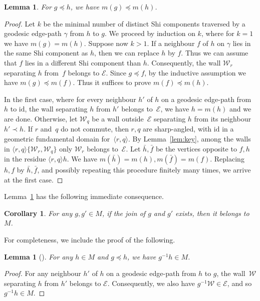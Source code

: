 \documentclass[11pt]{article}
\newtheorem{lemm}[theo]{Lemma}
\newtheorem{coro}[theo]{Corollary}
\theoremstyle{definition}
\numberwithin{equation}{section}
\newcommand{\id}{\mathrm{id}}
\newcommand{\W}{\mathcal{W}}
\begin{document}
\begin{lemm} 
	\label{lem:shadow}
	For $g\preceq h$, we have $m(g)\preceq m(h)$.
\end{lemm}
\begin{proof} Let $k$ be the minimal number of distinct Shi components traversed by a geodesic edge-path $\gamma$ from $h$ to $g$. We proceed by induction on $k$, where for $k=1$ we have $m(g)=m(h)$.
	Suppose now $k>1$.
	If a neighbour $f$ of $h$ on $\gamma$ lies in the same Shi component as $h$, then we can replace $h$ by $f$. Thus we can assume that $f$ lies in a different Shi component than $h$. Consequently, the wall $\W_r$ separating $h$ from~$f$ belongs to $\mathcal E$. Since $g\preceq f$, by the inductive assumption we have $m(g)\preceq m(f)$. Thus it suffices to prove $m(f)\preceq m(h)$.
	
	In the first case, where for every neighbour $h'$ of $h$ on a geodesic edge-path from~$h$ to $\id$, the wall separating $h$ from $h'$ belongs to~$\mathcal E$, we have $h=m(h)$ and we are done. Otherwise, let $\W_q$ be a wall outside~$\mathcal E$ separating $h$ from its neighbour $h'\prec h$. 
	If $r$ and~$q$ do not commute, then $r,q$ are sharp-angled, with $\id$
	in a geometric fundamental domain for~$\langle r,q\rangle$. By Lemma~\ref{lem:key}, among the walls in $\langle r,q\rangle\{\W_r,\W_q\}$ only $\W_r$ belongs to~$\mathcal E$. Let $\bar h, \bar f$ be the vertices opposite to $f,h$ in the residue $\langle r,q\rangle h$. We have $m(\bar h)=m(h), m(\bar f)=m(f)$. Replacing $h,f$ by $\bar h,\bar f$, and possibly repeating this procedure finitely many times, we arrive at the first case.
\end{proof}

Lemma~\ref{lem:shadow} has the following immediate consequence.

\begin{coro} 
	\label{cor:Shi}
	For any $g,g'\in M$, if the join of $g$ and $g'$ exists, then it belongs to~$M$. 
\end{coro}

For completeness, we include the proof of the following.

\begin{lemm}[{\cite[Prop 4.16]{DH}}]
	\label{lem:suffix_shi}
	For any $h \in M$ and $g \preceq h$, we have $g^{-1}h \in M$.
\end{lemm}
\begin{proof}
	For any neighbour $h'$ of $h$ on a geodesic edge-path from $h$ to $g$, the wall~$\W$ separating $h$ from $h'$ belongs to $\mathcal E$. Consequently, we also have $g^{-1}\W\in \mathcal E$, and so~$g^{-1}h\in M$. 
\end{proof}
\end{document}
